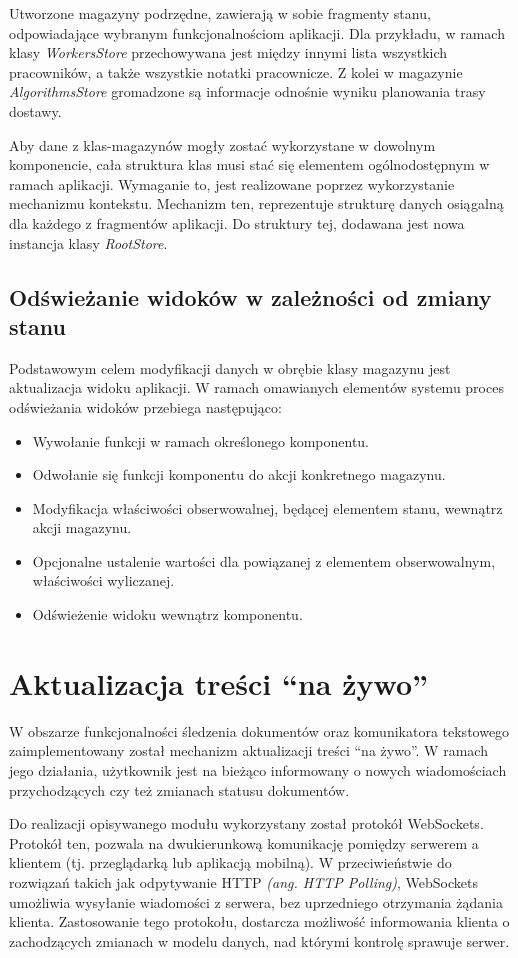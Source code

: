 Utworzone magazyny podrzędne, zawierają w sobie fragmenty stanu, odpowiadające wybranym funkcjonalnościom aplikacji. Dla przykładu, w ramach klasy \textit{WorkersStore} przechowywana jest między innymi lista wszystkich pracowników, a także wszystkie notatki pracownicze. Z kolei w magazynie \textit{AlgorithmsStore} gromadzone są informacje odnośnie wyniku planowania trasy dostawy.

Aby dane z klas-magazynów mogły zostać wykorzystane w dowolnym komponencie, cała struktura klas musi stać się elementem ogólnodostępnym w ramach aplikacji. Wymaganie to, jest realizowane poprzez wykorzystanie mechanizmu kontekstu. Mechanizm ten, reprezentuje strukturę danych osiągalną dla każdego z fragmentów aplikacji. Do struktury tej, dodawana jest nowa instancja klasy \textit{RootStore}.

\subsection{Odświeżanie widoków w zależności od zmiany stanu}
Podstawowym celem modyfikacji danych w obrębie klasy magazynu jest aktualizacja widoku aplikacji. W ramach omawianych elementów systemu proces odświeżania widoków przebiega następująco:
\begin{itemize}
	\item Wywołanie funkcji w ramach określonego komponentu.
	\item Odwołanie się funkcji komponentu do akcji konkretnego magazynu.
	\item Modyfikacja właściwości obserwowalnej, będącej elementem stanu, wewnątrz akcji magazynu.
	\item Opcjonalne ustalenie wartości dla powiązanej z elementem obserwowalnym, właściwości wyliczanej.
	\item Odświeżenie widoku wewnątrz komponentu.
\end{itemize}

\section{Aktualizacja treści "`na żywo"'}
W obszarze funkcjonalności śledzenia dokumentów oraz komunikatora tekstowego zaimplementowany został mechanizm aktualizacji treści "`na żywo"'. W ramach jego działania, użytkownik jest na bieżąco informowany o nowych wiadomościach przychodzących czy też zmianach statusu dokumentów.

Do realizacji opisywanego modułu wykorzystany został protokół WebSockets. Protokół ten, pozwala na dwukierunkową komunikację pomiędzy serwerem a klientem (tj. przeglądarką lub aplikacją mobilną). W przeciwieństwie do rozwiązań takich jak odpytywanie HTTP \textit{(ang. HTTP Polling)}, WebSockets umożliwia wysyłanie wiadomości z serwera, bez uprzedniego otrzymania żądania klienta. Zastosowanie tego protokołu, dostarcza możliwość informowania klienta o zachodzących zmianach w modelu danych, nad którymi kontrolę sprawuje serwer.

